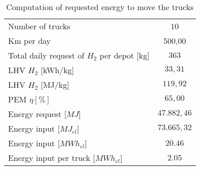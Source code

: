 \begin{table}[ht]
\centering
\begin{tabular}{|lc|}
\hline
\rowcolor{bluepoli!40}\multicolumn{2}{|c|}{\textbf{Energy Requirements}} \\ \hline
\multicolumn{1}{|l|}{Number of trucks}                                & 10           \\ \hline
\multicolumn{1}{|l|}{Km per day}                                      & 500,00       \\ \hline
\multicolumn{1}{|l|}{Total daily request of $H_2$ per depot {[}kg{]}} & $363$        \\ \hline
\multicolumn{1}{|l|}{LHV $H_2$ {[}kWh/kg{]}}                          & $33,31$      \\ \hline
\multicolumn{1}{|l|}{LHV $H_2$ {[}MJ/kg{]}}                           & $119,92$     \\ \hline
\multicolumn{1}{|l|}{PEM $\eta [\%]$}                                 & $65,00$      \\ \hline
\multicolumn{1}{|l|}{Energy request {[}$MJ${]}}                       & $47.882,46$  \\ \hline
\multicolumn{1}{|l|}{Energy input {[}$MJ_{el}${]}}                    & $73.665,32$  \\ \hline
\multicolumn{1}{|l|}{Energy input {[}$MWh_{el}${]}}                   & $20.46$      \\ \hline
\multicolumn{1}{|l|}{Energy input per truck {[}$MWh_{el}${]}}         & $2.05$       \\ \hline
\end{tabular}
\caption{Computation of requested energy to move the trucks}
\label{tab:requested}
\end{table}